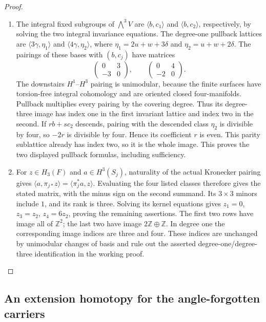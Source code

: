 \begin{proof}
\begin{enumerate}[label=\arabic*.,leftmargin=*]
\item The integral fixed subgroups of $\bigwedge^3 V$ are
$\langle b,c_1\rangle$ and $\langle b,c_2\rangle$, respectively, by
solving the two integral invariance equations. The degree-one pullback
lattices are $\langle3\gamma,\eta_1\rangle$ and
$\langle4\gamma,\eta_2\rangle$, where
$\eta_1=2u+w+3\delta$ and $\eta_2=u+w+2\delta$.
The pairings of these bases with $(b,c_j)$ have matrices
\[
 \begin{pmatrix}0&3\\-3&0\end{pmatrix},\qquad
 \begin{pmatrix}0&4\\-2&0\end{pmatrix}.
\]
The downstairs $H^1$--$H^3$ pairing is unimodular, because the finite
surfaces have torsion-free integral cohomology and are oriented closed
four-manifolds. Pullback multiplies every pairing by the covering degree.
Thus its degree-three image has index one in the first invariant lattice
and index two in the second. If $rb+sc_2$ descends, pairing with the
descended class $\eta_2$ is divisible by four, so $-2r$ is divisible by
four. Hence its coefficient $r$ is even. This parity sublattice already
has index two, so it is the whole image. This proves the two displayed
pullback formulas, including sufficiency.

\item For $z\in H_3(F)$ and $a\in H^3(S_j)$, naturality of the actual
Kronecker pairing gives $\langle a,\pi_{j*}z\rangle
=\langle\pi_j^*a,z\rangle$. Evaluating the four listed classes therefore
gives the stated matrix, with the minus sign on the second summand.
Its $3\times3$ minors include $1$, and its rank is three. Solving its
kernel equations gives $z_1=0$, $z_3=z_2$, $z_4=6z_2$, proving the
remaining assertions. The first two rows have image all of $\mathbb Z^2$;
the last two have image $2\mathbb Z\oplus\mathbb Z$. In degree one the
corresponding image indices are three and four. These indices are
unchanged by unimodular changes of basis and rule out the asserted
degree-one/degree-three identification in the working proof.
\end{enumerate}
\end{proof}

\subsection{An extension homotopy for the angle-forgotten carriers}
\label{mapsIII:carrier-extension-section}


